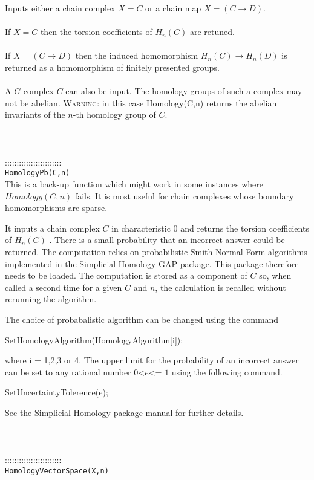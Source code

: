 \documentclass[a4paper,11pt]{report}
\begin{document}
{ Inputs either a chain complex $X=C$ or a chain map $X=(C \longrightarrow D)$. \\
 \\
If $X=C$ then the torsion coefficients of $H_n(C)$ are retuned.\\
 \\
 If $X=(C \longrightarrow D)$ then the induced homomorphism $H_n(C) \longrightarrow H_n(D)$ is returned as a homomorphism of finitely presented groups. \\
 \\
 A $G$-complex $C$ can also be input. The homology groups of such a complex may not be abelian. \textsc{Warning:} in this case Homology(C,n) returns the abelian invariants of the $n$-th homology group of $C$. \\
 \\
 \\
 \\
 ::::::::::::::::::::::::\\
 \texttt{HomologyPb(C,n)}\\
 

 This is a back-up function which might work in some instances where $Homology(C,n)$ fails. It is most useful for chain complexes whose boundary homomorphisms are
sparse. 

 It inputs a chain complex $C$ in characteristic $0$ and returns the torsion coefficients of $H_n(C)$ . There is a small probability that an incorrect answer could be returned. The
computation relies on probabilistic Smith Normal Form algorithms implemented
in the Simplicial Homology GAP package. This package therefore needs to be
loaded. The computation is stored as a component of $C$ so, when called a second time for a given $C$ and $n$, the calculation is recalled without rerunning the algorithm. 

 The choice of probabalistic algorithm can be changed using the command 

 SetHomologyAlgorithm(HomologyAlgorithm[i]);

 where i = 1,2,3 or 4. The upper limit for the probability of an incorrect
answer can be set to any rational number $0${\textless}$e${\textless}= $1$ using the following command. 

SetUncertaintyTolerence(e);

 See the Simplicial Homology package manual for further details. \\
 \\
 \\
 \\
 ::::::::::::::::::::::::\\
 \texttt{HomologyVectorSpace(X,n)}\\
 

}
\end{document}
